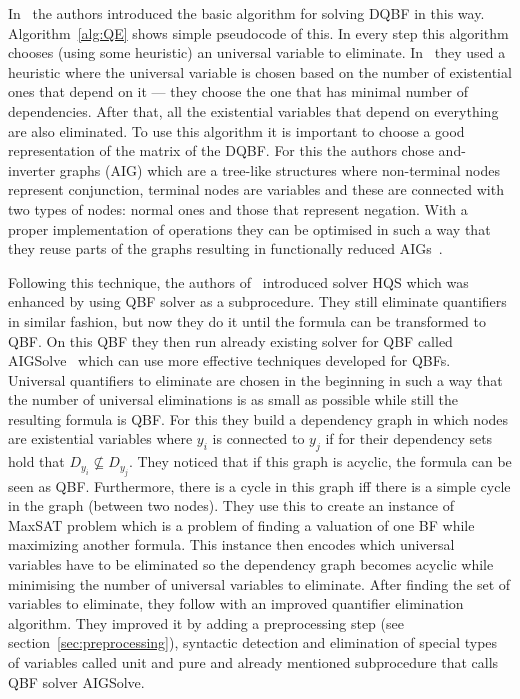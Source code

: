 \documentclass[
  digital, %
  twoside, %
  table,   %
  nolof,     %
  nolot,     %
]{fithesis3}
\theoremstyle{definition}
\theoremstyle{remark}
\begin{document}
In~\cite{HQSsimpleAlg} the authors introduced the basic algorithm for solving DQBF in this way. %
Algorithm~\ref{alg:QE} shows simple pseudocode of this. In every step this algorithm chooses (using some heuristic) an universal variable to eliminate. In~\cite{HQSsimpleAlg} they used a heuristic where the universal variable is chosen based on the number of existential ones that depend on it --- they choose the one that has minimal number of dependencies. After that, all the existential variables that depend on everything are also eliminated. To use this algorithm it is important to choose a good representation of the matrix of the DQBF. For this the authors chose and-inverter graphs (AIG) which are a tree-like structures where non-terminal nodes represent conjunction, terminal nodes are variables and these are connected with two types of nodes: normal ones and those that represent negation. With a proper implementation of operations they can be optimised in such a way that they reuse parts of the graphs resulting in functionally reduced AIGs~\cite{FRAIGs}.


Following this technique,  the authors of~\cite{HQSquantifierElimination} introduced solver HQS which was enhanced by using QBF solver as a subprocedure. They still eliminate quantifiers in similar fashion, but now they do it until the formula can be transformed to QBF. On this QBF they then run already existing solver for QBF called AIGSolve~\cite{AIGSolve} which can use more effective techniques developed for QBFs. Universal quantifiers to eliminate are chosen in the beginning in such a way that the number of universal eliminations is as small as possible while still the resulting formula is QBF. For this they build a dependency graph in which nodes are existential variables where $y_i$ is connected to $y_j$ if for their dependency sets hold that $D_{y_i} \not\subseteq D_{y_j}$. They noticed that if this graph is acyclic, the formula can be seen as QBF. Furthermore, there is a cycle in this graph iff there is a simple cycle in the graph (between two nodes). They use this to create an instance of MaxSAT problem which is a problem of finding a valuation of one BF while maximizing another formula. This instance then encodes which universal variables have to be eliminated so the dependency graph becomes acyclic while minimising the number of universal variables to eliminate. After finding the set of variables to eliminate, they follow with an improved quantifier elimination algorithm. They improved it by adding a preprocessing step (see section~\ref{sec:preprocessing}), syntactic detection and elimination of special types of variables called unit and pure and already mentioned subprocedure that calls QBF solver AIGSolve.
\end{document}
